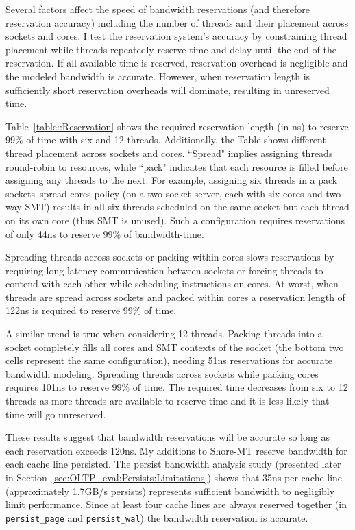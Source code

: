 Several factors affect the speed of bandwidth reservations (and therefore reservation accuracy) including the number of threads and their placement across sockets and cores.
I test the reservation system's accuracy by constraining thread placement while threads repeatedly reserve time and delay until the end of the reservation.
If all available time is reserved, reservation overhead is negligible and the modeled bandwidth is accurate.
However, when reservation length is sufficiently short reservation overheads will dominate, resulting in unreserved time.



Table~\ref{table::Reservation} shows the required reservation length (in ns) to reserve 99\% of time with six and 12 threads.
Additionally, the Table shows different thread placement across sockets and cores.
``Spread" implies assigning threads round-robin to resources, while ``pack" indicates that each resource is filled before assigning any threads to the next.
For example, assigning six threads in a pack sockets--spread cores policy (on a two socket server, each with six cores and two-way SMT) results in all six threads scheduled on the same socket but each thread on its own core (thus SMT is unused).
Such a configuration requires reservations of only 44ns to reserve 99\% of bandwidth-time.

Spreading threads across sockets or packing within cores slows reservations by requiring long-latency communication between sockets or forcing threads to contend with each other while scheduling instructions on cores.
At worst, when threads are spread across sockets and packed within cores a reservation length of 122ns is required to reserve 99\% of time.

A similar trend is true when considering 12 threads.
Packing threads into a socket completely fills all cores and SMT contexts of the socket (the bottom two cells represent the same configuration), needing 51ns reservations for accurate bandwidth modeling.
Spreading threads across sockets while packing cores requires 101ns to reserve 99\% of time.
The required time decreases from six to 12 threads as more threads are available to reserve time and it is less likely that time will go unreserved.

These results suggest that bandwidth reservations will be accurate so long as each reservation exceeds 120ns.
My additions to Shore-MT reserve bandwidth for each cache line persisted.
The persist bandwidth analysis study (presented later in Section~\ref{sec:OLTP_eval:Persists:Limitations}) shows that 35ns per cache line (approximately 1.7GB/s persists) represents sufficient bandwidth to negligibly limit performance.
Since at least four cache lines are always reserved together (in \texttt{persist\_page} and \texttt{persist\_wal}) the bandwidth reservation is accurate.

